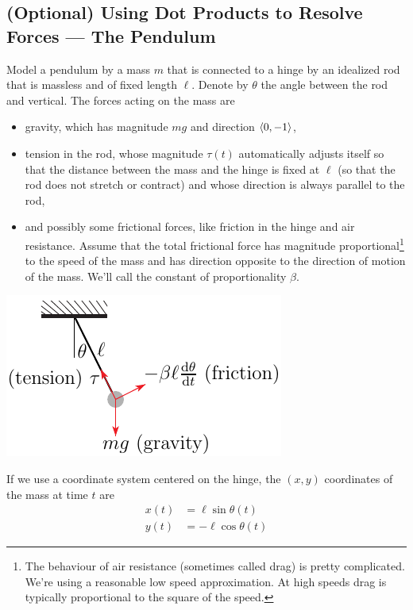 \subsection{(Optional) Using Dot Products to Resolve Forces
--- The Pendulum}
Model a pendulum by a mass $m$ that is connected to a hinge by an idealized
rod that is massless and of fixed length $\ell$. Denote by $\theta$ the angle
between the rod and vertical. The forces acting on the mass are
\begin{itemize}
\item gravity, which has magnitude $mg$ and direction $\left< 0,-1\right>$, 
\item tension in the rod, whose magnitude $\tau(t)$ automatically 
adjusts itself so that the distance between the mass and the hinge is fixed 
at $\ell$ (so that the rod does not stretch or contract) and whose 
direction is always parallel to the rod, 
\item and possibly some frictional
forces, like friction in the hinge and air resistance. Assume
that the total frictional force has magnitude proportional\footnote{The
behaviour of air resistance (sometimes called drag) is pretty complicated. 
We're using a reasonable low speed approximation. At high speeds drag is typically proportional to the square of the speed.} to the speed of the 
mass and has direction opposite to the direction of motion of the mass.
We'll call the constant of proportionality $\beta$.
\end{itemize}
      \begin{efig} 
      \begin{center}
      \includegraphics{pendulum3.pdf}
      \end{center}
      \end{efig}
If we use a coordinate system centered on the hinge, the $(x,y)$ coordinates
of the mass at time $t$ are 
\begin{align*}
x(t)&=\ell\sin\theta(t)\\
y(t)&=-\ell\cos\theta(t)
\end{align*}
